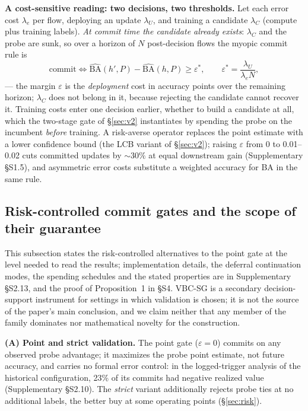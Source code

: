 \documentclass[a4paper,fleqn]{cas-sc}
\begin{document}
\textbf{A cost-sensitive reading: two decisions, two thresholds.} Let each error cost $\lambda_e$ per flow, deploying an update $\lambda_U$, and training a candidate $\lambda_C$ (compute plus training labels). \emph{At commit time the candidate already exists}: $\lambda_C$ and the probe are sunk, so over a horizon of $N$ post-decision flows the myopic commit rule is
$$\mathrm{commit} \iff \widehat{\mathrm{BA}}(h',P) - \widehat{\mathrm{BA}}(h,P) \ge \varepsilon^{\ast}, \qquad \varepsilon^{\ast} = \frac{\lambda_U}{\lambda_e N},$$
--- the margin $\varepsilon$ is the \emph{deployment} cost in accuracy points over the remaining horizon; $\lambda_C$ does not belong in it, because rejecting the candidate cannot recover it. Training costs enter one decision earlier, whether to build a candidate at all, which the two-stage gate of \S\ref{sec:v2} instantiates by spending the probe on the incumbent \emph{before} training. A risk-averse operator replaces the point estimate with a lower confidence bound (the LCB variant of \S\ref{sec:v2}); raising $\varepsilon$ from 0 to 0.01--0.02 cuts committed updates by ${\sim}30\%$ at equal downstream gain (Supplementary \S S1.5), and asymmetric error costs substitute a weighted accuracy for BA in the same rule.


\subsection{Risk-controlled commit gates and the scope of their guarantee}
\label{sec:riskgates}

This subsection states the risk-controlled alternatives to the point gate at the level needed to read the results; implementation details, the deferral continuation modes, the spending schedules and the stated properties are in Supplementary \S S2.13, and the proof of Proposition~1 in \S S4. VBC-SG is a secondary decision-support instrument for settings in which validation is chosen; it is not the source of the paper's main conclusion, and we claim neither that any member of the family dominates nor mathematical novelty for the construction.

\textbf{(A) Point and strict validation.} The point gate ($\varepsilon{=}0$) commits on any observed probe advantage; it maximizes the probe point estimate, not future accuracy, and carries no formal error control: in the logged-trigger analysis of the historical configuration, 23\% of its commits had negative realized value (Supplementary \S S2.10). The \emph{strict} variant additionally rejects probe ties at no additional labels, the better buy at some operating points (\S\ref{sec:risk}).
\end{document}
